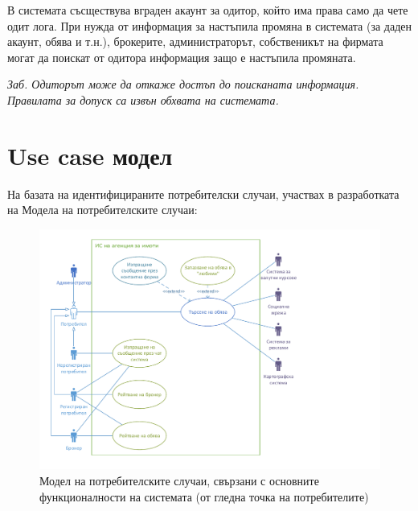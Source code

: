 \documentclass[a4paper]{article}
\begin{document}
В системата съсществува вграден акаунт за одитор, който има права само да чете одит лога. При нужда от информация за настъпила промяна в системата (за даден акаунт, обява и т.н.), брокерите, администраторът, собственикът на фирмата могат да поискат от одитора информация защо е настъпила промяната. 
	
\emph{Заб. Одиторът може да откаже достъп до поисканата информация. Правилата за допуск са извън обхвата на системата.}

\clearpage
\section*{Use case модел}

На базата на идентифицираните потребителски случаи, участвах в разработката на Модела на потребителските случаи:

        \begin{figure}[h]
        \centering
        \includegraphics[scale=1]{uc2a}
        \caption{Модел на потребителските случаи, свързани с основните функционалности на системата (от гледна точка на потребителите)}
        \end{figure}

\clearpage
\end{document}
